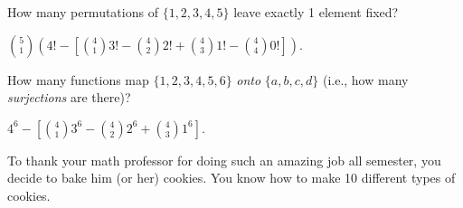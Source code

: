 \begin{questions}
	\begin{answer}
	\end{answer}
	
	


\question How many permutations of $\{1,2,3,4,5\}$ leave exactly 1 element fixed?

	\begin{answer}
		 ${5 \choose 1}\left( 4! - \left[{4 \choose 1}3! - {4 \choose 2}2! + {4 \choose 3} 1! - {4 \choose 4} 0!\right] \right)$.
	\end{answer}
	
	


\question How many functions map $\{1,2,3,4,5,6\}$ {\em onto} $\{a,b,c,d\}$ (i.e., how many {\em surjections} are there)?

	\begin{answer}
		$4^6 - \left[{4 \choose 1}3^6 - {4 \choose 2}2^6 + {4 \choose 3} 1^6 \right]$.
	\end{answer}
	



\question To thank your math professor for doing such an amazing job all semester, you decide to bake him (or her) cookies.  You know how to make 10 different types of cookies.
\end{questions}
